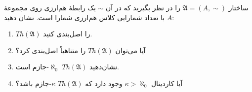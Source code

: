 ساختار $\mathfrak{A} = (A, \sim)$ را در نظر بگیرید که در آن $\sim$ یک رابطهٔ هم‌ارزی روی مجموعهٔ $A$ با تعداد شمارایی کلاس هم‌ارزی شمارا است. نشان دهید:
\begin{enumerate}[label=(\alph*)]
  \item $Th(\mathfrak{A})$ را اصل‌بندی کنید.
  \item آیا می‌توان $Th(\mathfrak{A})$ را متناهیاً اصل‌بندی کرد؟
  \item نشان‌دهید $Th(\mathfrak{A})$ $\aleph_0$-جازم است.
  \item آیا کاردینال $\kappa > \aleph_0$ وجود دارد که $Th(\mathfrak{A})$ $\kappa$-جازم باشد؟
\end{enumerate}\quad
\begin{ans}
\end{ans}
